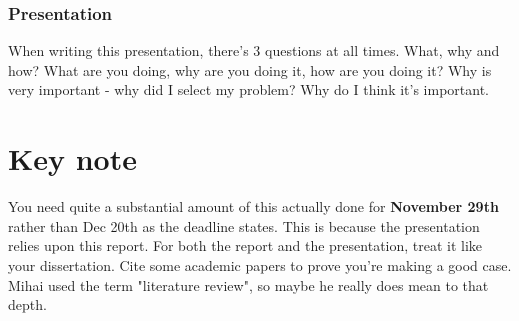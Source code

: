 \documentclass[12pt]{report}
\begin{document}
\subsection{Presentation}
When writing this presentation, there's 3 questions at all times. What, why and how?
What are you doing, why are you doing it, how are you doing it?
Why is very important - why did I select my problem? Why do I think it's important.


\chapter{Key note}
You need quite a substantial amount of this actually done for \textbf{November 29th} rather than Dec 20th as the 
deadline states. This is because the presentation relies upon this report. For both the report and the presentation,
treat it like your dissertation. Cite some academic papers to prove you're making a good case. Mihai used the 
term "literature review", so maybe he really does mean to that depth.
\end{document}
